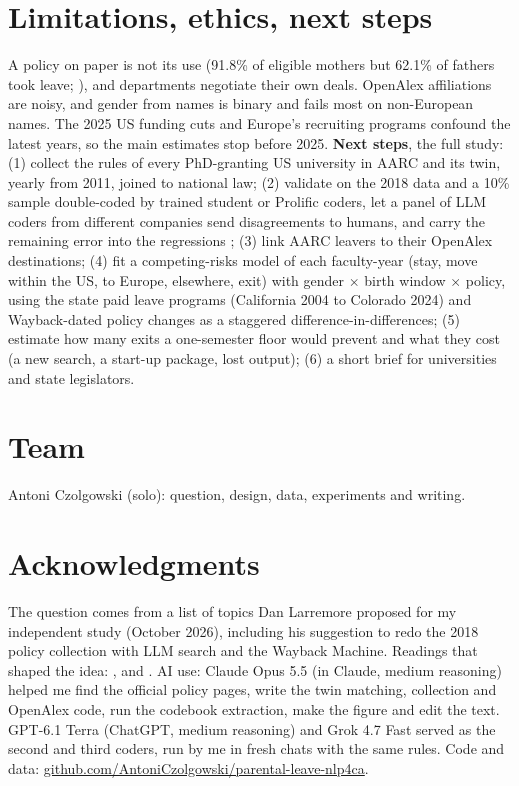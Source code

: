 \documentclass[10pt,twocolumn]{article}
\begin{document}
\section{Limitations, ethics, next steps}
A policy on paper is not its use (91.8\% of eligible mothers but 62.1\% of fathers took leave; \citealp{morgan2021}), and departments negotiate their own deals. OpenAlex affiliations are noisy, and gender from names is binary and fails most on non-European names. The 2025 US funding cuts and Europe's recruiting programs confound the latest years, so the main estimates stop before 2025. \textbf{Next steps}, the full study: (1) collect the rules of every PhD-granting US university in AARC and its twin, yearly from 2011, joined to national law; (2) validate on the 2018 data and a 10\% sample double-coded by trained student or Prolific coders, let a panel of LLM coders from different companies send disagreements to humans, and carry the remaining error into the regressions \citep{gligoric2025}; (3) link AARC leavers to their OpenAlex destinations; (4) fit a competing-risks model of each faculty-year (stay, move within the US, to Europe, elsewhere, exit) with gender $\times$ birth window $\times$ policy, using the state paid leave programs (California 2004 to Colorado 2024) and Wayback-dated policy changes as a staggered difference-in-differences; (5) estimate how many exits a one-semester floor would prevent and what they cost (a new search, a start-up package, lost output); (6) a short brief for universities and state legislators.

\section*{Team}
Antoni Czolgowski (solo): question, design, data, experiments and writing.

\section*{Acknowledgments}
The question comes from a list of topics Dan Larremore proposed for my independent study (October 2026), including his suggestion to redo the 2018 policy collection with LLM search and the Wayback Machine. Readings that shaped the idea: \citet{gligoric2025}, \citet{bamman2024} and \citet{than2025}. AI use: Claude Opus 5.5 (in Claude, medium reasoning) helped me find the official policy pages, write the twin matching, collection and OpenAlex code, run the codebook extraction, make the figure and edit the text. GPT-6.1 Terra (ChatGPT, medium reasoning) and Grok 4.7 Fast served as the second and third coders, run by me in fresh chats with the same rules. Code and data: \url{github.com/AntoniCzolgowski/parental-leave-nlp4ca}.
\end{document}
